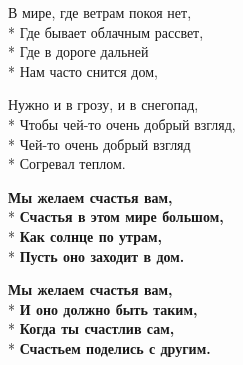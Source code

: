 \medskip

\begin{minipage}{\linewidth}
В мире, где ветрам покоя нет,\\*
Где бывает облачным рассвет,\\*
Где в дороге дальней\\*
Нам часто снится дом,\\
\end{minipage}\par\medskip\nobreak

\medskip

\begin{minipage}{\linewidth}
Нужно и в грозу, и в снегопад,\\*
Чтобы чей-то очень добрый взгляд,\\*
Чей-то очень добрый взгляд\\*
Согревал теплом.\\
\end{minipage}\par\medskip\nobreak

\medskip

\begin{minipage}{\linewidth}
\hspace*{1.5em}\textbf{Мы желаем счастья вам,}\\*
\hspace*{1.5em}\textbf{Счастья в этом мире большом,}\\*
\hspace*{1.5em}\textbf{Как солнце по утрам,}\\*
\hspace*{1.5em}\textbf{Пусть оно заходит в дом.}\\
\end{minipage}\par\medskip\nobreak

\medskip

\begin{minipage}{\linewidth}
\hspace*{1.5em}\textbf{Мы желаем счастья вам,}\\*
\hspace*{1.5em}\textbf{И оно должно быть таким,}\\*
\hspace*{1.5em}\textbf{Когда ты счастлив сам,}\\*
\hspace*{1.5em}\textbf{Счастьем поделись с другим.}\\
\end{minipage}

